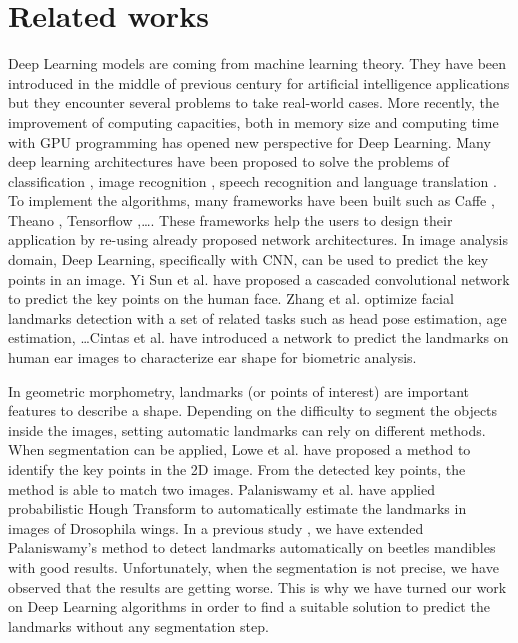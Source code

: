 \documentclass[10pt]{article}
\begin{document}
\section{Related works}
Deep Learning models are coming from machine learning theory. They
have been introduced in the middle of previous century for artificial
intelligence applications but they encounter several problems to
take real-world cases. More recently, the improvement of computing capacities, both in
memory size and computing time with GPU programming has opened new perspective  
for Deep Learning. Many deep learning architectures have been proposed
to solve the problems of classification \cite{krizhevsky2012imagenet,
  ciregan2012multi}, image recognition \cite{szegedy2015going,
  farabet2013learning, li2015convolutional}, speech recognition
\cite{mikolov2011strategies, hinton2012deep} and language translation
\cite{jean2014using, sutskever2014sequence}. To implement the algorithms, many frameworks have been built such as Caffe
\cite{jia2014caffe}, Theano \cite{2016arXiv160502688short}, Tensorflow
\cite{tensorflow2015},\ldots. These frameworks help
the users to design their application by re-using already proposed network
architectures. In image analysis domain,
Deep Learning, specifically with CNN, can be used to predict the key points in
an image. Yi Sun et al. \cite{sun2013deep} have proposed a cascaded
convolutional network to predict the key points on the human
face. Zhang et al. \cite{zhang2014facial} optimize facial landmarks
detection with a set of related tasks such as head pose estimation,
age estimation, \ldots Cintas et al. \cite{cintas2016automatic} have
introduced a network to predict the landmarks on human ear images to
characterize ear shape for biometric analysis.


In geometric morphometry, landmarks (or points of interest) are important features to describe a shape. Depending on the difficulty to segment the objects inside the images, setting automatic landmarks can rely on different methods. When segmentation can be applied, Lowe et
al. \cite{lowe2004distinctive} have proposed a method to identify the
key points in the 2D image. From the detected key points, the method
is able to match two images. Palaniswamy et
al. \cite{palaniswamy2010automatic} have applied probabilistic Hough
Transform to automatically estimate the landmarks in images of
Drosophila wings. In a previous study \cite{le2017maelab}, we have extended
Palaniswamy's method to detect landmarks automatically on beetles
mandibles with good results. Unfortunately, when the segmentation is not precise, we have observed that the results are getting worse. This is why we have turned our work on Deep Learning algorithms in order to find a suitable solution to predict the landmarks without any segmentation step.
\end{document}
